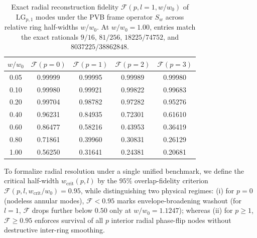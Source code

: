 \documentclass[aps,pra,onecolumn,notitlepage,11pt,tightenlines,nofootinbib,floatfix,longbibliography]{revtex4-2}
\theoremstyle{remark}
\begin{document}
\begin{table}[t]
\caption{Exact radial reconstruction fidelity $\mathcal{F}(p, l=1, w/w_0)$ of $\mathrm{LG}_{p,1}$ modes under the PVB frame operator $S_w$ across relative ring half-widths $w/w_0$. At $w/w_0 = 1.00$, entries match the exact rationals $9/16$, $81/256$, $18225/74752$, and $8037225/38862848$.}
\label{tab:fidelity}
\begin{ruledtabular}
\setlength{\tabcolsep}{3.5pt}
\begin{tabular}{ccccc}
$w / w_0$ & $\mathcal{F}(p=0)$ & $\mathcal{F}(p=1)$ & $\mathcal{F}(p=2)$ & $\mathcal{F}(p=3)$ \\
\hline
0.05 & 0.99999 & 0.99995 & 0.99989 & 0.99980 \\
0.10 & 0.99980 & 0.99921 & 0.99822 & 0.99683 \\
0.20 & 0.99704 & 0.98782 & 0.97282 & 0.95276 \\
0.40 & 0.96231 & 0.84935 & 0.72301 & 0.61610 \\
0.60 & 0.86477 & 0.58216 & 0.43953 & 0.36419 \\
0.80 & 0.71861 & 0.39960 & 0.30831 & 0.26129 \\
1.00 & 0.56250 & 0.31641 & 0.24381 & 0.20681 \\
\end{tabular}
\end{ruledtabular}
\end{table}

To formalize radial resolution under a single unified benchmark, we define the critical half-width $w_{\mathrm{crit}}(p,l)$ by the $95\%$ overlap-fidelity criterion $\mathcal{F}(p,l,w_{\mathrm{crit}}/w_0) = 0.95$, while distinguishing two physical regimes: (i) for $p = 0$ (nodeless annular modes), $\mathcal{F} < 0.95$ marks envelope-broadening washout (for $l = 1$, $\mathcal{F}$ drops further below $0.50$ only at $w/w_0 = 1.1247$); whereas (ii) for $p \ge 1$, $\mathcal{F} \ge 0.95$ enforces survival of all $p$ interior radial phase-flip nodes without destructive inter-ring smoothing.
\end{document}
